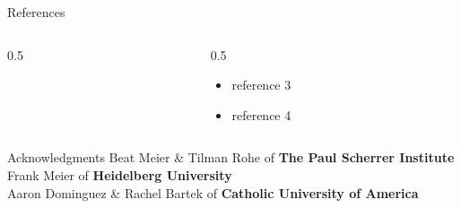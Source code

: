 \documentclass[final]{beamer}
\newlength{\onecolwide}
\begin{document}
\begin{frame}[t]
\begin{columns}[t]
\begin{column}{\onecolwide}
\begin{block}{References}
\begin{columns}[t]
\begin{column}{0.5\onecolwide}
\begin{itemize}
          \end{itemize}
        \end{column}
        \begin{column}{0.5\onecolwide}
          \begin{itemize}
            \item reference 3
            \item reference 4
          \end{itemize}
        \end{column}
      \end{columns}
    \end{block}
    \begin{block}{Acknowledgments} 
      \footnotesize
      Beat Meier \& Tilman Rohe of \textbf{The Paul Scherrer Institute}\\
      Frank Meier of \textbf{Heidelberg University}\\
      Aaron Dominguez \& Rachel Bartek of \textbf{Catholic University of America}
    \end{block}
  \end{column}
\end{columns}

\end{frame} %
\end{document}

